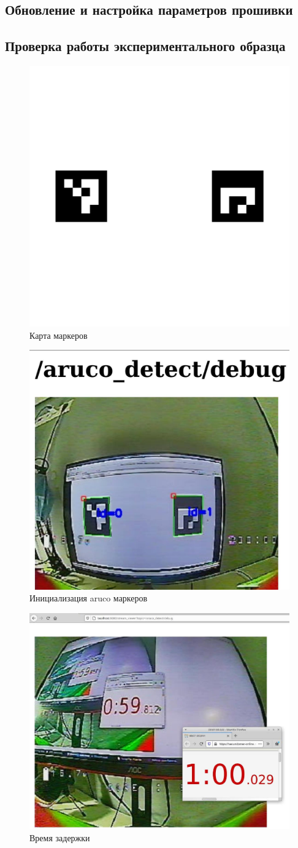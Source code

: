 \subsection{Обновление и настройка параметров прошивки}

\subsection{Проверка работы экспериментального образца}
\begin{figure}[H]
	\centering
	\includegraphics[width=0.5\linewidth]{pics/map}
	\caption{Карта маркеров
	}
	\label{fig:map}
\end{figure}

\begin{figure}[H]
	\centering
	\includegraphics[width=0.5\linewidth]{pics/aruco_detect}
	\caption{Инициализация aruco маркеров
	}
	\label{fig:aruco_detect}
\end{figure}

\begin{figure}[H]
	\centering
	\includegraphics[width=0.5\linewidth]{pics/time}
	\caption{Время задержки%
	}
	\label{fig:time}
\end{figure}
